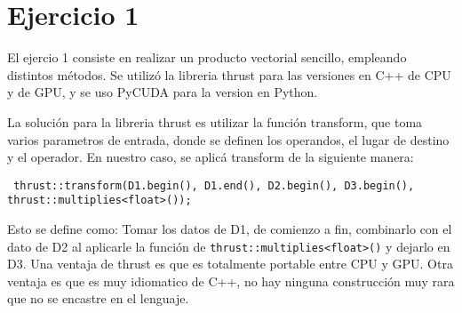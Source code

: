 \section{Ejercicio 1}

El ejercio 1 consiste en realizar un producto vectorial sencillo, empleando distintos m\'etodos.
Se utiliz\'o la libreria thrust para las versiones en C++ de CPU y de GPU, y se uso PyCUDA para
la version en Python.

La soluci\'on para la libreria thrust es utilizar la funci\'on transform, que toma varios parametros
de entrada, donde se definen los operandos, el lugar de destino y el operador. En nuestro caso,
se aplic\'a transform de la siguiente manera:

\texttt{
    thrust::transform(D1.begin(), D1.end(), D2.begin(), D3.begin(),
                       thrust::multiplies<float>());
}

Esto se define como: Tomar los datos de D1, de comienzo a fin, combinarlo con el dato de D2 al aplicarle la funci\'on 
de \texttt{thrust::multiplies<float>()} y dejarlo en D3. Una ventaja de thrust es que es totalmente 
portable entre CPU y GPU. Otra ventaja es que es muy idiomatico de C++, no hay ninguna construcci\'on muy rara
que no se encastre en el lenguaje. 


